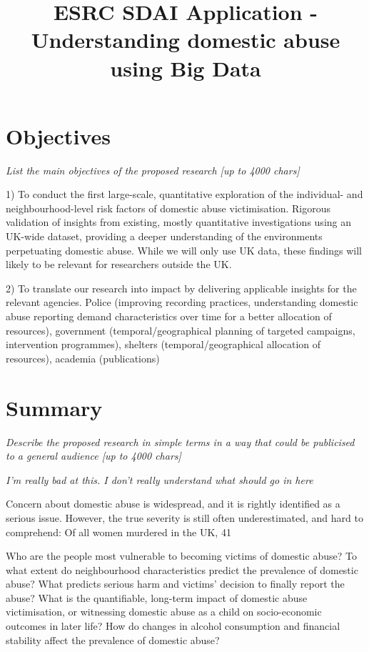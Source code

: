 \documentclass[11pt, a4paper]{article}
\begin{document}
\title{ESRC SDAI Application - Understanding domestic abuse using Big Data}
\date{}
\maketitle
\section{Objectives}
\textit{List the main objectives of the proposed research [up to 4000 chars]}


1) To conduct the first large-scale, quantitative exploration of the individual- and neighbourhood-level risk factors of domestic abuse victimisation. Rigorous validation of insights from existing, mostly quantitative investigations using an UK-wide dataset, providing a deeper understanding of the environments perpetuating domestic abuse. While we will only use UK data, these findings will likely to be relevant for researchers outside the UK. 

2) To translate our research into impact by delivering applicable insights for the relevant agencies.  Police (improving recording practices, understanding domestic abuse reporting demand characteristics over time for a better allocation of resources), government (temporal/geographical planning of targeted campaigns, intervention programmes), shelters (temporal/geographical allocation of resources), academia (publications)
 
\section{Summary}

\textit{Describe the proposed research in simple terms in a way that could be publicised to a general audience [up to 4000 chars]}

\textit{I'm really bad at this. I don't really understand what should go in here}

Concern about domestic abuse is widespread, and it is rightly identified as a serious issue. However, the true severity is still often underestimated, and hard to comprehend: Of all women murdered in the UK, 41%

Who are the people most vulnerable to becoming victims of domestic abuse? To what extent do neighbourhood characteristics predict the prevalence of domestic abuse? What predicts serious harm and victims' decision to finally report the abuse? What is the quantifiable, long-term impact of domestic abuse victimisation, or witnessing domestic abuse as a child on socio-economic outcomes in later life? How do changes in alcohol consumption and financial stability affect the prevalence of domestic abuse?
\end{document}
